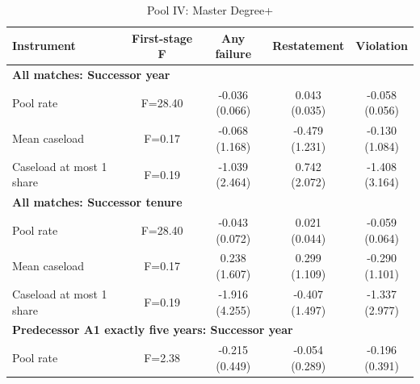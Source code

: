 \begin{table}[htbp]
\footnotesize
\def\sym#1{\ifmmode^{#1}\else\(^{#1}\)\fi}
\centering
\caption{Pool IV: Master Degree+}
\begin{threeparttable}
\begin{tabular}{p{}cccc}
\toprule
Instrument & First-stage F & Any failure & Restatement & Violation \\
\midrule
\multicolumn{5}{l}{\textbf{All matches: Successor year}} \\
Pool rate & F=28.40 & \shortstack{-0.036\\(0.066)} & \shortstack{0.043\\(0.035)} & \shortstack{-0.058\\(0.056)} \\
Mean caseload & F=0.17 & \shortstack{-0.068\\(1.168)} & \shortstack{-0.479\\(1.231)} & \shortstack{-0.130\\(1.084)} \\
Caseload at most 1 share & F=0.19 & \shortstack{-1.039\\(2.464)} & \shortstack{0.742\\(2.072)} & \shortstack{-1.408\\(3.164)} \\
\multicolumn{5}{l}{\textbf{All matches: Successor tenure}} \\
Pool rate & F=28.40 & \shortstack{-0.043\\(0.072)} & \shortstack{0.021\\(0.044)} & \shortstack{-0.059\\(0.064)} \\
Mean caseload & F=0.17 & \shortstack{0.238\\(1.607)} & \shortstack{0.299\\(1.109)} & \shortstack{-0.290\\(1.101)} \\
Caseload at most 1 share & F=0.19 & \shortstack{-1.916\\(4.255)} & \shortstack{-0.407\\(1.497)} & \shortstack{-1.337\\(2.977)} \\
\multicolumn{5}{l}{\textbf{Predecessor A1 exactly five years: Successor year}} \\
Pool rate & F=2.38 & \shortstack{-0.215\\(0.449)} & \shortstack{-0.054\\(0.289)} & \shortstack{-0.196\\(0.391)} \\

\end{tabular}
\end{threeparttable}
\end{table}
